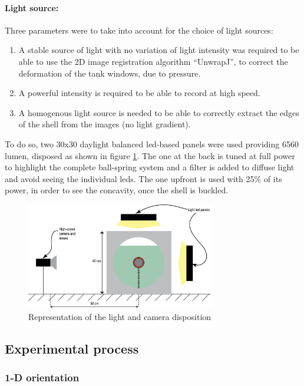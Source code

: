 \paragraph{Light source:}
Three parameters were to take into account for the choice of light sources:
\begin{enumerate}
	\item A stable source of light with no variation of light intensity was required to be able to use the 2D image registration algorithm "`UnwrapJ"', to correct the deformation of the tank windows, due to pressure.
	\item A powerful intensity is required to be able to record at high speed.
	\item A homogenous light source is needed to be able to correctly extract the edges of the shell from the images (no light gradient).	
\end{enumerate}
To do so, two 30x30 daylight balanced led-based panels were used providing 6560 lumen, disposed as shown in figure \ref{fig:schematics_spring}. The one at the back is tuned at full power to highlight the complete ball-spring system and a filter is added to diffuse light and avoid seeing the individual leds. The one upfront is used with 25\% of its power, in order to see the concavity, once the shell is buckled.
\begin{figure}[H] %
	\centering%
  \includegraphics[width=0.73\textwidth]{figures/Chapter_1/schematic_experimental_setup_light_lenses.png}
	\caption{Representation of the light and camera disposition}
	\label{fig:schematics_spring}
\end{figure}
\newpage
\subsection{Experimental process}
\subsubsection{1-D orientation}
